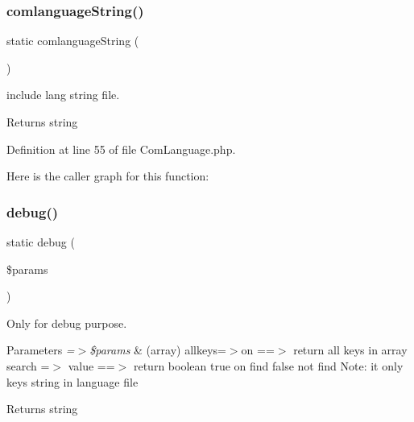 \subsubsection{\texorpdfstring{comlanguage\+String()}{comlanguageString()}}
{\footnotesize\ttfamily static comlanguage\+String (\begin{DoxyParamCaption}{ }\end{DoxyParamCaption})\hspace{0.3cm}{\ttfamily [static]}}

include lang string file.

\begin{DoxyReturn}{Returns}
string 
\end{DoxyReturn}


Definition at line 55 of file Com\+Language.\+php.

Here is the caller graph for this function\+:
\mbox{\label{class_zest_1_1_component_1_1_language_1_1_com_language_a39f92ff73a1a732560a5efcdaa755f0c}} 
\subsubsection{\texorpdfstring{debug()}{debug()}}
{\footnotesize\ttfamily static debug (\begin{DoxyParamCaption}\item[{}]{\$params }\end{DoxyParamCaption})\hspace{0.3cm}{\ttfamily [static]}}

Only for debug purpose.


\begin{DoxyParams}{Parameters}
{\em =$>$\$params} & (array) \textquotesingle{}allkeys\textquotesingle{}=$>$\textquotesingle{}on\textquotesingle{} ==$>$ return all keys in array \textquotesingle{}search\textquotesingle{} =$>$ \textquotesingle{}value\textquotesingle{} ==$>$ return boolean true on find false not find Note\+: it only keys string in language file\\
\hline
\end{DoxyParams}
\begin{DoxyReturn}{Returns}
string 
\end{DoxyReturn}


